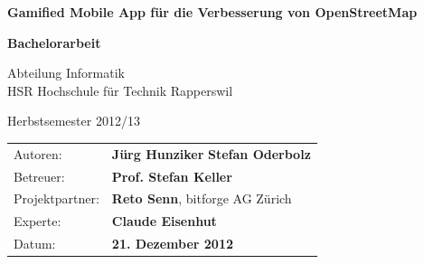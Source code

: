 \begin{titlepage}

\begin{figure}[H]
\hfill
{}
\end{figure}

\vspace{2.2cm}

\begin{center}
{ \Large
	\textbf{Gamified Mobile App für die Verbesserung von OpenStreetMap}
	\vspace{1cm}

	\textbf{Bachelorarbeit}
	\vspace{1cm}

	Abteilung Informatik \\[0.2cm]
	HSR Hochschule für Technik Rapperswil
	\vspace{1cm}

	Herbstsemester 2012/13
}
\end{center}
\vspace{2.3cm}


\begin{table}[H] 
\centering 
\begin{tabular}{p{0.19\twocelltabwidth}p{0.4\twocelltabwidth}}
Autoren: & \textbf{Jürg Hunziker} \newline
\textbf{Stefan Oderbolz} \\ 
Betreuer: & \textbf{Prof. Stefan Keller} \\ 
Projektpartner: & \textbf{Reto Senn}, bitforge AG Zürich \\ 
Experte: & \textbf{Claude Eisenhut} \\ 
Datum: & \textbf{21. Dezember 2012} \\ 
\end{tabular}
\end{table}

\end{titlepage}